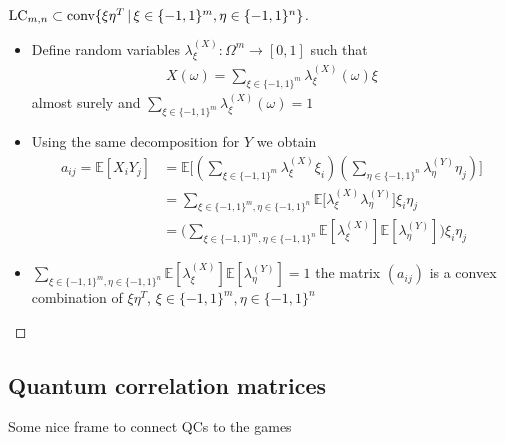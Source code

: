 \begin{frame}
	\begin{proof}[$   \textup{LC}_{m,n}  \subset \textup{conv} \{  \xi\eta^T \, | \, \xi \in \{-1,1\}^m, \eta \in \{-1,1\}^n     \} $]
		\begin{itemize}
			\item<1-> {\footnotesize Define random variables $ \lambda_{\xi}^{(X)}: \Omega^m \to [0,1] $ such that 
			\begin{align*}
			X(\omega) = \sum_{\xi \in \{-1,1\}^m}\lambda_{\xi}^{(X)}(\omega)\xi
			\end{align*} 
			almost surely 
			and $ \sum_{\xi \in \{-1,1\}^m}\lambda_{\xi}^{(X)}(\omega) = 1  $}
			\item<2-> Using the same decomposition for $ Y $ we obtain 
			\begin{align*}
			a_{ij} = \mathbb{E}[X_iY_j] &= \mathbb{E} \big [  (\sum_{\xi \in \{-1,1\}^m}\lambda_{\xi}^{(X)}\xi_i ) (\sum_{\eta \in \{-1,1\}^n}\lambda_{\eta}^{(Y)}\eta_j ) \big ]   \\
			&= \sum_{\xi \in \{-1,1\}^m, \eta \in \{-1,1\}^n} \mathbb{E}\big [\lambda_{\xi}^{(X)}\lambda_{\eta}^{(Y)} \big ] \xi_i \eta_j  \\
			&= \big (\sum_{\xi \in \{-1,1\}^m, \eta \in \{-1,1\}^n}\mathbb{E} [\lambda_{\xi}^{(X)} ]\mathbb{E}[\lambda_{\eta}^{(Y)}]\big )\xi_i\eta_j
			\end{align*}
			\item<3-> $ \sum_{\xi \in \{-1,1\}^m, \eta \in \{-1,1\}^n}\mathbb{E} [\lambda_{\xi}^{(X)} ]\mathbb{E}[\lambda_{\eta}^{(Y)}] = 1 $
			the matrix $ (a_{ij}) $ is a convex combination of $ \xi \eta^T $, $ \xi \in \{-1,1\}^m, \eta \in \{-1,1 \}^n $
		\end{itemize}
	\end{proof}
\end{frame}



\subsection{Quantum correlation matrices}

\begin{frame}
	Some nice frame to connect QCs to the games 
\end{frame}

